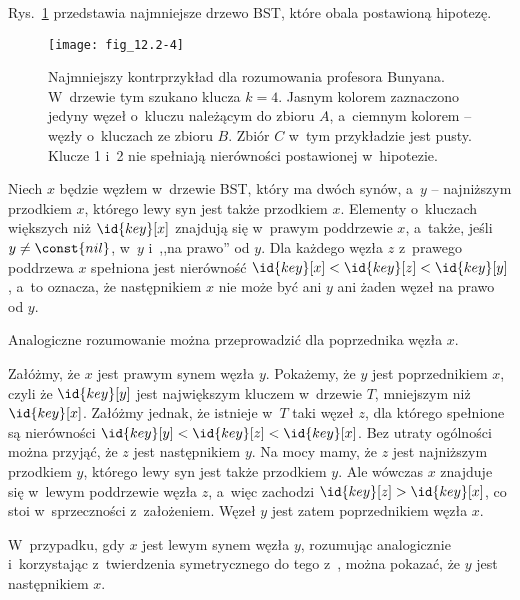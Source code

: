\exercise %
Rys.~\ref{fig:12.2-4} przedstawia najmniejsze drzewo BST, które obala postawioną hipotezę.
\begin{figure}[ht]
	\begin{center}
		\texttt{[image: fig\_12.2-4]}
	\end{center}
	\caption{Najmniejszy kontrprzykład dla rozumowania profesora Bunyana. W~drzewie tym szukano klucza $k=4$. Jasnym kolorem zaznaczono jedyny węzeł o~kluczu należącym do zbioru $A$, a~ciemnym kolorem -- węzły o~kluczach ze zbioru $B$. Zbiór $C$ w~tym przykładzie jest pusty. Klucze 1 i~2 nie spełniają nierówności postawionej w~hipotezie.} \label{fig:12.2-4}
\end{figure}

\exercise %
Niech $x$ będzie węzłem w~drzewie BST, który ma dwóch synów, a~$y$ -- najniższym przodkiem $x$, którego lewy syn jest także przodkiem $x$. Elementy o~kluczach większych niż $\id{key}[x]$ znajdują się w~prawym poddrzewie $x$, a~także, jeśli $y\ne\const{nil}$, w~$y$ i~,,na prawo'' od $y$. Dla każdego węzła $z$ z~prawego poddrzewa $x$ spełniona jest nierówność $\id{key}[x]<\id{key}[z]<\id{key}[y]$, a~to oznacza, że następnikiem $x$ nie może być ani $y$ ani żaden węzeł na prawo od $y$.

Analogiczne rozumowanie można przeprowadzić dla poprzednika węzła $x$.

\exercise %
\exercise %
\exercise %
\exercise %
Załóżmy, że $x$ jest prawym synem węzła $y$. Pokażemy, że $y$ jest poprzednikiem $x$, czyli że $\id{key}[y]$ jest największym kluczem w~drzewie $T$, mniejszym niż $\id{key}[x]$. Załóżmy jednak, że istnieje w~$T$ taki węzeł $z$, dla którego spełnione są nierówności $\id{key}[y]<\id{key}[z]<\id{key}[x]$. Bez utraty ogólności można przyjąć, że $z$ jest następnikiem $y$. Na mocy  mamy, że $z$ jest najniższym przodkiem $y$, którego lewy syn jest także przodkiem $y$. Ale wówczas $x$ znajduje się w~lewym poddrzewie węzła $z$, a~więc zachodzi $\id{key}[z]>\id{key}[x]$, co stoi w~sprzeczności z~założeniem. Węzeł $y$ jest zatem poprzednikiem węzła $x$.

W~przypadku, gdy $x$ jest lewym synem węzła $y$, rozumując analogicznie i~korzystając z~twierdzenia symetrycznego do tego z~, można pokazać, że $y$ jest następnikiem $x$.


